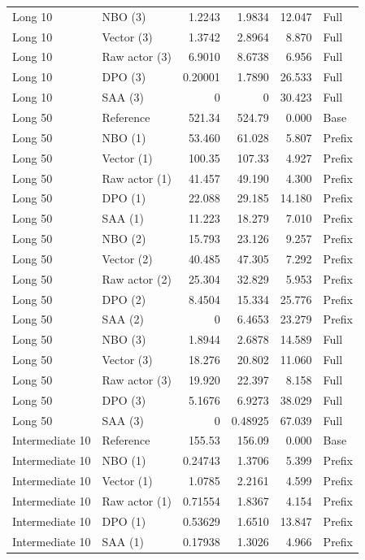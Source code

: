 \begin{longtable}{llrrrl}
Long 10 & NBO (3) & 1.2243 & 1.9834 & 12.047 & Full\\
Long 10 & Vector (3) & 1.3742 & 2.8964 & 8.870 & Full\\
Long 10 & Raw actor (3) & 6.9010 & 8.6738 & 6.956 & Full\\
Long 10 & DPO (3) & 0.20001 & 1.7890 & 26.533 & Full\\
Long 10 & SAA (3) & 0 & 0 & 30.423 & Full\\
\addlinespace
Long 50 & Reference & 521.34 & 524.79 & 0.000 & Base\\
Long 50 & NBO (1) & 53.460 & 61.028 & 5.807 & Prefix\\
Long 50 & Vector (1) & 100.35 & 107.33 & 4.927 & Prefix\\
Long 50 & Raw actor (1) & 41.457 & 49.190 & 4.300 & Prefix\\
Long 50 & DPO (1) & 22.088 & 29.185 & 14.180 & Prefix\\
Long 50 & SAA (1) & 11.223 & 18.279 & 7.010 & Prefix\\
Long 50 & NBO (2) & 15.793 & 23.126 & 9.257 & Prefix\\
Long 50 & Vector (2) & 40.485 & 47.305 & 7.292 & Prefix\\
Long 50 & Raw actor (2) & 25.304 & 32.829 & 5.953 & Prefix\\
Long 50 & DPO (2) & 8.4504 & 15.334 & 25.776 & Prefix\\
Long 50 & SAA (2) & 0 & 6.4653 & 23.279 & Prefix\\
Long 50 & NBO (3) & 1.8944 & 2.6878 & 14.589 & Full\\
Long 50 & Vector (3) & 18.276 & 20.802 & 11.060 & Full\\
Long 50 & Raw actor (3) & 19.920 & 22.397 & 8.158 & Full\\
Long 50 & DPO (3) & 5.1676 & 6.9273 & 38.029 & Full\\
Long 50 & SAA (3) & 0 & 0.48925 & 67.039 & Full\\
\addlinespace
Intermediate 10 & Reference & 155.53 & 156.09 & 0.000 & Base\\
Intermediate 10 & NBO (1) & 0.24743 & 1.3706 & 5.399 & Prefix\\
Intermediate 10 & Vector (1) & 1.0785 & 2.2161 & 4.599 & Prefix\\
Intermediate 10 & Raw actor (1) & 0.71554 & 1.8367 & 4.154 & Prefix\\
Intermediate 10 & DPO (1) & 0.53629 & 1.6510 & 13.847 & Prefix\\
Intermediate 10 & SAA (1) & 0.17938 & 1.3026 & 4.966 & Prefix\\

\end{longtable}
